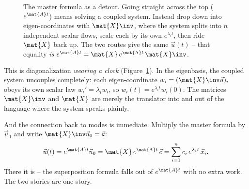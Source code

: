 \begin{figure}[H]
\centering
{}
\caption{The master formula as a detour. Going straight across the top
($e^{\mat{A}t}$) means solving a coupled system. Instead drop down into
eigen-coordinates with $\mat{X}\inv$, where the system splits into $n$
independent scalar flows, scale each by its own $e^{\lambda_i t}$, then ride
$\mat{X}$ back up. The two routes give the same $\vec{u}(t)$ -- that equality
\emph{is} $e^{\mat{A}t}=\mat{X}\,e^{\mat{\Lambda}t}\,\mat{X}\inv$.}
\label{ch25:fig-detour}
\end{figure}

\begin{intuitionbox}
This is diagonalization \emph{wearing a clock} (Figure~\ref{ch25:fig-detour}). In
the eigenbasis, the coupled system uncouples completely: each eigen-coordinate
$w_i = (\mat{X}\inv\vec{u})_i$ obeys its own scalar law $w_i' = \lambda_i w_i$, so
$w_i(t) = e^{\lambda_i t} w_i(0)$. The matrices $\mat{X}\inv$ and $\mat{X}$ are
merely the translator into and out of the language where the system speaks
plainly.
\end{intuitionbox}

And the connection back to modes is immediate. Multiply the master formula by
$\vec{u}_0$ and write $\mat{X}\inv\vec{u}_0 = \vec{c}$:
\[
  \vec{u}(t) = e^{\mat{A}t}\vec{u}_0
  = \mat{X}\,e^{\mat{\Lambda}t}\,\vec{c}
  = \sum_{i=1}^n c_i\, e^{\lambda_i t}\,\vec{x}_i.
\]
There it is -- the superposition formula falls out of $e^{\mat{A}t}$ with no extra
work. The two stories are one story.

